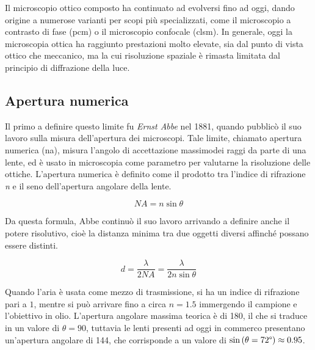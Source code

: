\documentclass[../main.tex]{subfiles}
\begin{document}
Il microscopio ottico composto ha continuato ad evolversi fino ad oggi, dando origine a numerose varianti per scopi più specializzati, come il microscopio a contrasto di fase (\acrshort{pcm})\cite{zernike_1955} o il microscopio confocale (\acrshort{clsm})\cite{pawley_2006}. In generale, oggi la microscopia ottica ha raggiunto prestazioni molto elevate, sia dal punto di vista ottico che meccanico, ma la cui risoluzione spaziale è rimasta limitata dal principio di diffrazione della luce.

\subsection{Apertura numerica} \label{s:na}

Il primo a definire questo limite fu \textit{Ernst Abbe} nel 1881, quando pubblicò il suo lavoro sulla misura dell'apertura dei microscopi.\cite{abbe_1881} Tale limite, chiamato apertura numerica (\acrshort{na}), misura l'angolo di accettazione massimodei raggi da parte di una lente, ed è usato in microscopia come parametro per valutarne la risoluzione delle ottiche. L'apertura numerica è definito come il prodotto tra l'indice di rifrazione \textit{n} e il seno dell'apertura angolare della lente.

\begin{equation}
	\mathit{NA}=n\sin\theta
\end{equation}

Da questa formula, Abbe continuò il suo lavoro arrivando a definire anche il potere risolutivo, cioè la distanza minima tra due oggetti diversi affinché possano essere distinti.\cite{abbe_1882}

\begin{equation}
d=\frac{\lambda}{2\mathit{NA}}=\frac{\lambda}{2n\sin\theta}
\end{equation}

Quando l'aria è usata come mezzo di trasmissione, si ha un indice di rifrazione pari a $1$, mentre si può arrivare fino a circa $n=1.5$ immergendo il campione e l'obiettivo in olio. L'apertura angolare massima teorica è di 180\degree, il che si traduce in un valore di $\theta=90$\degree, tuttavia le lenti presenti ad oggi in commerco presentano un'apertura angolare di 144\degree, che corrisponde a un valore di $\sin\left(\theta=72\degree\right) \approx 0.95$.\cite{leica_aperture}\\
\end{document}
